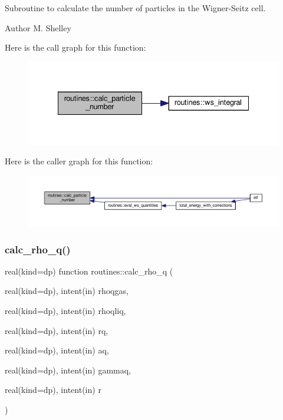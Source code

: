 Subroutine to calculate the number of particles in the Wigner-\/\+Seitz cell. 

\begin{DoxyAuthor}{Author}
M. Shelley 
\end{DoxyAuthor}
Here is the call graph for this function\+:
\nopagebreak
\begin{figure}[H]
\begin{center}
\leavevmode
\includegraphics[width=335pt]{namespaceroutines_a0b8346e8e5457d6befb48b0ac56f4fdf_cgraph}
\end{center}
\end{figure}
Here is the caller graph for this function\+:
\nopagebreak
\begin{figure}[H]
\begin{center}
\leavevmode
\includegraphics[width=350pt]{namespaceroutines_a0b8346e8e5457d6befb48b0ac56f4fdf_icgraph}
\end{center}
\end{figure}
\mbox{\label{namespaceroutines_a407a248748ce7c0e2e9e5dce03cc9415}} 
\subsubsection{\texorpdfstring{calc\+\_\+rho\+\_\+q()}{calc\_rho\_q()}}
{\footnotesize\ttfamily real(kind=dp) function routines\+::calc\+\_\+rho\+\_\+q (\begin{DoxyParamCaption}\item[{real(kind=dp), intent(in)}]{rhoqgas,  }\item[{real(kind=dp), intent(in)}]{rhoqliq,  }\item[{real(kind=dp), intent(in)}]{rq,  }\item[{real(kind=dp), intent(in)}]{aq,  }\item[{real(kind=dp), intent(in)}]{gammaq,  }\item[{real(kind=dp), intent(in)}]{r }\end{DoxyParamCaption})}



